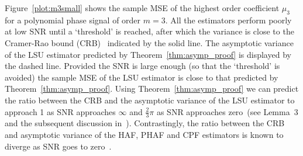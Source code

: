 \documentclass[journal]{IEEEtran}
\begin{document}
Figure~\ref{plot:m3small} shows the sample MSE of the highest order coefficient $\mu_3$ for a polynomial phase signal of order $m=3$.  All the estimators perform poorly at low SNR until a `threshold' is reached, after which the variance is close to the Cramer-Rao bound (CRB)~\cite{Peleg1991_CRB_PPS_1991} indicated by the solid line.  The asymptotic variance of the LSU estimator predicted by Theorem~\ref{thm:asymp_proof} is displayed by the dashed line.  Provided the SNR is large enough (so that the `threshold' is avoided) the sample MSE of the LSU estimator is close to that predicted by Theorem~\ref{thm:asymp_proof}.  Using Theorem~\ref{thm:asymp_proof} we can predict the ratio between the CRB and the asymptotic variance of the LSU estimator to approach 1 as SNR approaches $\infty$ and $\tfrac{2}{3}\pi$ as SNR approaches zero~(see Lemma~3 and the subsequent discussion in~\cite{Quinn2009_dasp_phase_only_information_loss}).  Contrastingly, the ratio between the CRB and asymptotic variance of the HAF, PHAF and CPF estimators is known to diverge as SNR goes to zero~\cite{Porat_asympt_HAF_DPT_1996,Oshea_cpf_2004,Djurovic_haf_cpf_2012}.  %
\end{document}

